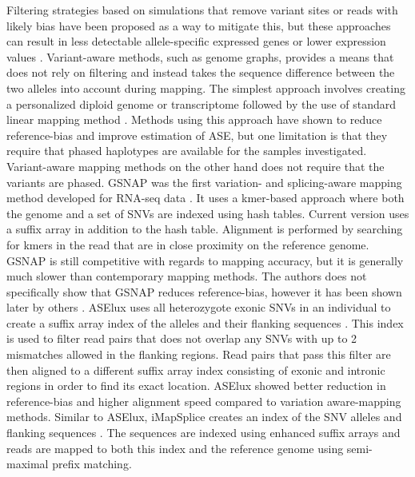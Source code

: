 Filtering strategies based on simulations that remove variant sites or reads with likely bias have been proposed as a way to mitigate this, but these approaches can result in less detectable allele-specific expressed genes or lower expression values \cite{Castel2015-ef,Van_de_Geijn2015-dz}. 
Variant-aware methods, such as genome graphs, provides a means that does not rely on filtering and instead takes the sequence difference between the two alleles into account during mapping.
The simplest approach involves creating a personalized diploid genome or transcriptome followed by the use of standard linear mapping method \cite{Turro2011-op,Rozowsky_2011,Bray_2016,Raghupathy2018-sd}.
Methods using this approach have shown to reduce reference-bias and improve estimation of ASE, but one limitation is that they require that phased haplotypes are available for the samples investigated.
Variant-aware mapping methods on the other hand does not require that the variants are phased.
GSNAP was the first variation- and splicing-aware mapping method developed for RNA-seq data \cite{Wu2010-hv}.
It uses a kmer-based approach where both the genome and a set of SNVs are indexed using hash tables. %
Current version uses a suffix array in addition to the hash table.
Alignment is performed by searching for kmers in the read that are in close proximity on the reference genome. %
GSNAP is still competitive with regards to mapping accuracy, but it is generally much slower than contemporary mapping methods.
The authors does not specifically show that GSNAP reduces reference-bias, however it has been shown later by others \cite{Castel2015-ef}.
ASElux uses all heterozygote exonic SNVs in an individual to create a suffix array index of the alleles and their flanking sequences \cite{Miao2018-ps}. 
This index is used to filter read pairs that does not overlap any SNVs with up to 2 mismatches allowed in the flanking regions. 
Read pairs that pass this filter are then aligned to a different suffix array index consisting of exonic and intronic regions in order to find its exact location. 
ASElux showed better reduction in reference-bias and higher alignment speed compared to variation aware-mapping methods.
Similar to ASElux, iMapSplice creates an index of the SNV alleles and flanking sequences \cite{Liu_2018}.
The sequences are indexed using enhanced suffix arrays and reads are mapped to both this index and the reference genome using semi-maximal prefix matching.
